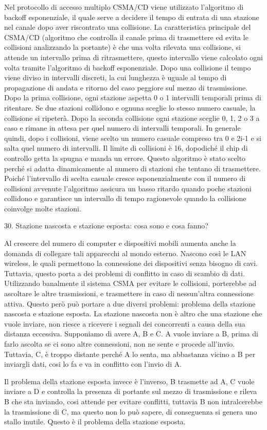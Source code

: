 Nel protocollo di accesso multiplo CSMA/CD viene utilizzato l’algoritmo di backoff esponenziale, il quale serve a decidere il tempo di entrata di una stazione nel canale dopo aver riscontrato una collisione.
La caratteristica principale del CSMA/CD (algoritmo che controlla il canale prima di trasmettere ed evita le collisioni analizzando la portante) è che una volta rilevata una collisione, si attende un intervallo prima di ritrasmettere, questo intervallo viene calcolato ogni volta tramite l’algoritmo di backoff esponenziale.
Dopo una collisione il tempo viene diviso in intervalli discreti, la cui lunghezza è uguale al tempo di propagazione di andata e ritorno del caso peggiore sul mezzo di trasmissione.
Dopo la prima collisione, ogni stazione aspetta 0 o 1 intervalli temporali prima di ritentare. Se due stazioni collidono e ognuna sceglie lo stesso numero casuale, la collisione si ripeterà. Dopo la seconda collisione ogni stazione sceglie 0, 1, 2 o 3 a caso e rimane in attesa per quel numero di intervalli temporali. In generale quindi, dopo i collisioni, viene scelto un numero casuale compreso tra 0 e 2i-1 e si salta quel numero di intervalli. Il limite di collisioni è 16, dopodiché il chip di controllo getta la spugna e manda un errore.
Questo algoritmo è stato scelto perché si adatta dinamicamente al numero di stazioni che tentano di trasmettere. Poiché l’intervallo di scelta casuale cresce esponenzialmente con il numero di collisioni avvenute l’algoritmo assicura un basso ritardo quando poche stazioni collidono e garantisce un intervallo di tempo ragionevole quando la collisione coinvolge molte stazioni.




30.	Stazione nascosta e stazione esposta: cosa sono e cosa fanno?

Al crescere del numero di computer e dispositivi mobili aumenta anche la domanda di collegare tali apparecchi al mondo esterno.
Nascono così le LAN wireless, le quali permettono la connessione dei dispositivi senza bisogno di cavi.
Tuttavia, questo porta a dei problemi di conflitto in caso di scambio di dati.
Utilizzando banalmente il sistema CSMA per evitare le collisioni, porterebbe ad ascoltare le altre trasmissioni, e trasmettere in caso di nessun’altra connessione attiva.
Questo però può portare a due diversi problemi: problema della stazione nascosta e stazione esposta.
La stazione nascosta non è altro che una stazione che vuole inviare, non riesce a ricevere i segnali dei concorrenti a causa della sua distanza eccessiva. Supponiamo di avere A, B e C. A vuole inviare a B, prima di farlo ascolta se ci sono altre connessioni, non ne sente e procede all’invio. Tuttavia, C, è troppo distante perché A lo senta, ma abbastanza vicino a B per inviargli dati, cosi lo fa e va in conflitto con l’invio di A.
 
Il problema della stazione esposta invece è l’inverso, B trasmette ad A, C vuole inviare a D e controlla la presenza di portante sul mezzo di trasmissione e rileva B che sta inviando, cosi attende per evitare conflitti, tuttavia B non intralcerebbe la trasmissione di C, ma questo non lo può sapere, di conseguenza si genera uno stallo inutile. Questo è il problema della stazione esposta.
 
